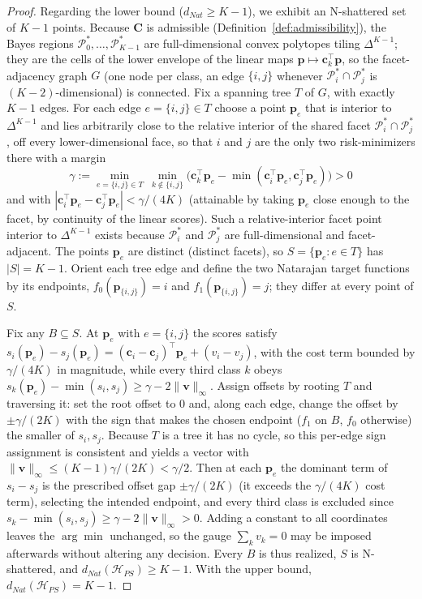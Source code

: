 \begin{proof}
    Regarding the lower bound ($d_{Nat} \geq K-1$), we exhibit an N-shattered set of $K-1$ points. Because $\mathbf{C}$ is admissible (Definition~\ref{def:admissibility}), the Bayes regions $\mathcal{P}_0^*, \ldots, \mathcal{P}_{K-1}^*$ are full-dimensional convex polytopes tiling $\Delta^{K-1}$; they are the cells of the lower envelope of the linear maps $\mathbf{p} \mapsto \mathbf{c}_k^\top \mathbf{p}$, so the facet-adjacency graph $G$ (one node per class, an edge $\{i,j\}$ whenever $\mathcal{P}_i^* \cap \mathcal{P}_j^*$ is $(K{-}2)$-dimensional) is connected. Fix a spanning tree $T$ of $G$, with exactly $K-1$ edges. For each edge $e=\{i,j\}\in T$ choose a point $\mathbf{p}_e$ that is interior to $\Delta^{K-1}$ and lies arbitrarily close to the relative interior of the shared facet $\mathcal{P}_i^* \cap \mathcal{P}_j^*$, off every lower-dimensional face, so that $i$ and $j$ are the only two risk-minimizers there with a margin
    \begin{equation*}
        \gamma := \min_{e=\{i,j\}\in T}\ \min_{k\notin\{i,j\}}\big(\mathbf{c}_k^\top \mathbf{p}_e - \min(\mathbf{c}_i^\top \mathbf{p}_e,\mathbf{c}_j^\top \mathbf{p}_e)\big) > 0
    \end{equation*}
    and with $|\mathbf{c}_i^\top \mathbf{p}_e - \mathbf{c}_j^\top \mathbf{p}_e| < \gamma/(4K)$ (attainable by taking $\mathbf{p}_e$ close enough to the facet, by continuity of the linear scores). Such a relative-interior facet point interior to $\Delta^{K-1}$ exists because $\mathcal{P}_i^*$ and $\mathcal{P}_j^*$ are full-dimensional and facet-adjacent. The points $\mathbf{p}_e$ are distinct (distinct facets), so $S=\{\mathbf{p}_e:e\in T\}$ has $|S|=K-1$. Orient each tree edge and define the two Natarajan target functions by its endpoints, $f_0(\mathbf{p}_{\{i,j\}})=i$ and $f_1(\mathbf{p}_{\{i,j\}})=j$; they differ at every point of $S$.

    Fix any $B \subseteq S$. At $\mathbf{p}_e$ with $e=\{i,j\}$ the scores satisfy $s_i(\mathbf{p}_e)-s_j(\mathbf{p}_e) = (\mathbf{c}_i-\mathbf{c}_j)^\top\mathbf{p}_e + (v_i-v_j)$, with the cost term bounded by $\gamma/(4K)$ in magnitude, while every third class $k$ obeys $s_k(\mathbf{p}_e)-\min(s_i,s_j) \ge \gamma - 2\|\mathbf{v}\|_\infty$. Assign offsets by rooting $T$ and traversing it: set the root offset to $0$ and, along each edge, change the offset by $\pm\gamma/(2K)$ with the sign that makes the chosen endpoint ($f_1$ on $B$, $f_0$ otherwise) the smaller of $s_i,s_j$. Because $T$ is a tree it has no cycle, so this per-edge sign assignment is consistent and yields a vector with $\|\mathbf{v}\|_\infty \le (K-1)\gamma/(2K) < \gamma/2$. Then at each $\mathbf{p}_e$ the dominant term of $s_i-s_j$ is the prescribed offset gap $\pm\gamma/(2K)$ (it exceeds the $\gamma/(4K)$ cost term), selecting the intended endpoint, and every third class is excluded since $s_k-\min(s_i,s_j) \ge \gamma - 2\|\mathbf{v}\|_\infty > 0$. Adding a constant to all coordinates leaves the $\arg\min$ unchanged, so the gauge $\sum_k v_k = 0$ may be imposed afterwards without altering any decision. Every $B$ is thus realized, $S$ is N-shattered, and $d_{Nat}(\mathcal{H}_{PS}) \geq K-1$. With the upper bound, $d_{Nat}(\mathcal{H}_{PS}) = K-1$.
\end{proof}

